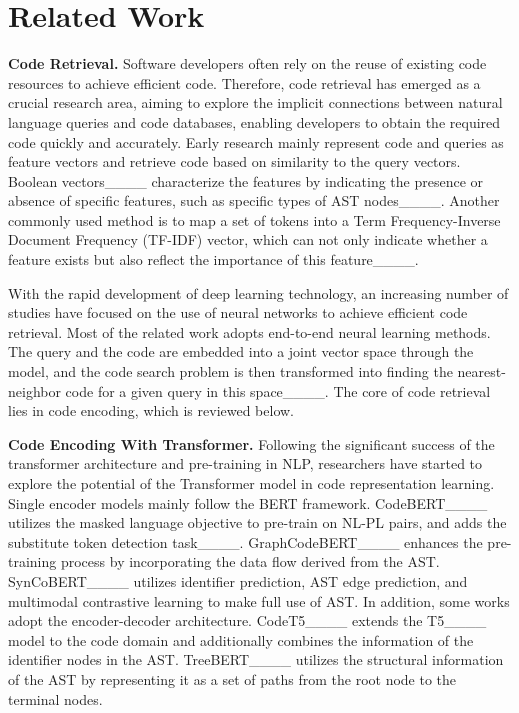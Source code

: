 \section{Related Work}
\noindent 
\textbf{Code Retrieval.}
Software developers often rely on the reuse of existing code resources to achieve efficient code. Therefore, code retrieval has emerged as a crucial research area, aiming to explore the implicit connections between natural language queries and code databases, enabling developers to obtain the required code quickly and accurately. Early research mainly represent code and queries as feature vectors and retrieve code based on similarity to the query vectors. Boolean vectors____ characterize the features by indicating the presence or absence of specific features, such as specific types of AST nodes____. Another commonly used method is to map a set of tokens into a Term Frequency-Inverse Document Frequency (TF-IDF) vector, which can not only indicate whether a feature exists but also reflect the importance of this feature____.  

With the rapid development of deep learning technology, an increasing number of studies have focused on the use of neural networks to achieve efficient code retrieval. Most of the related work adopts end-to-end neural learning methods. The query and the code are embedded into a joint vector space through the model, and the code search problem is then transformed into finding the nearest-neighbor code for a given query in this space____. 
The core of code retrieval lies in code encoding, which is reviewed below.

\noindent 
\textbf{Code Encoding With Transformer.}
Following the significant success of the transformer architecture and pre-training in NLP, researchers have started to explore the potential of the Transformer model in code representation learning. Single encoder models mainly follow the BERT framework. CodeBERT____ utilizes the masked language objective to pre-train on NL-PL pairs, and adds the substitute token detection task____. GraphCodeBERT____ enhances the pre-training process by incorporating the data flow derived from the AST. SynCoBERT____ utilizes identifier prediction, AST edge prediction, and multimodal contrastive learning to make full use of AST. In addition, some works adopt the encoder-decoder architecture. 
CodeT5____ extends the T5____ model to the code domain and additionally combines the information of the identifier nodes in the AST. TreeBERT____ utilizes the structural information of the AST by representing it as a set of paths from the root node to the terminal nodes. 

